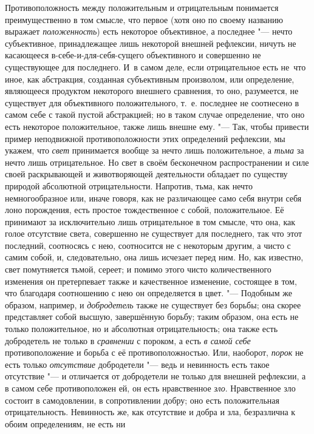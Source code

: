Противоположность между положительным и отрицательным понимается
преимущественно в том смысле, что первое (хотя оно по своему названию
выражает {\em положенность}) есть некоторое
объективное, а последнее "--- нечто субъективное, принадлежащее лишь некоторой
внешней рефлексии, ничуть не касающееся в-себе-и-для-себя-сущего
объективного и совершенно не существующее для последнего. И~в самом деле,
если отрицательное есть не~что иное, как абстракция, созданная субъективным
произволом, или определение, являющееся продуктом некоторого внешнего
сравнения, то оно, разумеется, не существует для объективного
положительного, т.~е. последнее не соотнесено в самом себе с такой пустой
абстракцией; но в таком случае определение, что оно есть некоторое
положительное, также лишь внешне ему. "--- Так, чтобы привести пример
неподвижной противоположности этих определений рефлексии, мы укажем, что
{\em свет} принимается вообще за нечто лишь
положительное, а {\em тьма} за нечто лишь
отрицательное. Но свет в своём бесконечном распространении и силе своей
раскрывающей и животворяющей деятельности обладает по существу природой
абсолютной отрицательности. Напротив, тьма, как нечто немногообразное или,
иначе говоря, как не различающее само себя внутри себя лоно порождения,
есть простое тождественное с собой, положительное. Её принимают за
исключительно лишь отрицательное в том смысле, что она, как голое
отсутствие света, совершенно не существует для последнего, так что этот
последний, соотносясь с нею, соотносится не с некоторым другим, а чисто с
самим собой, и, следовательно, она лишь исчезает перед ним. Но, как
известно, свет помутняется тьмой, сереет; и помимо этого чисто
количественного изменения он претерпевает также и качественное изменение,
состоящее в том, что благодаря соотношению с нею он определяется
в цвет. "--- Подобным же образом, например, и {\em добродетель}
также не существует без борьбы; она скорее представляет собой высшую,
завершённую борьбу; таким образом, она есть не только положительное, но и
абсолютная отрицательность; она также есть добродетель не только в
{\em сравнении} с пороком, а есть
{\em в самой себе} противоположение и борьба с её
противоположностью. Или, наоборот, {\em порок} не есть
только {\em отсутствие} добродетели "--- ведь и невинность
есть такое отсутствие "--- и отличается от добродетели не только для внешней
рефлексии, а в самом себе противоположен ей, он есть нравственное
{\em зло}. Нравственное зло состоит в самодовлении, в
сопротивлении добру; оно есть положительная отрицательность. Невинность же,
как отсутствие и добра и зла, безразлична к обоим определениям, не есть ни
